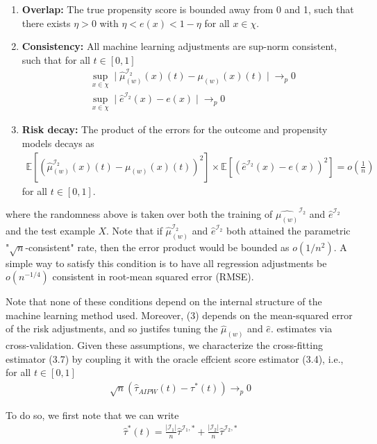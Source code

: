 \begin{enumerate}
    \item \textbf{Overlap:} The true propensity score is bounded away from 0 and 1, such
    that there exists $\eta > 0$ with $\eta < e(x) < 1 - \eta$ for all $x \in \chi$.
    \item \textbf{Consistency:} All machine learning adjustments are sup-norm
    consistent, such that for all $t \in [0, 1]$
    \begin{align}
        &\sup_{x \in \chi} \mid \hat{\mu}_{(w)}^{\mathcal{I}_2}(x)(t) - \mu_{(w)}(x)(t)
        \mid \to_p 0\\
        &\sup_{x \in \chi} \mid \hat{e}^{\mathcal{I}_2}(x) - e(x) \mid \to_p 0
    \end{align}
    \item \textbf{Risk decay:} The product of the errors for the outcome and propensity
    models decays as
    \begin{align}
        \mathbb{E}[(\hat{\mu}_{(w)}^{\mathcal{I}_2}(x)(t) - \mu_{(w)}(x)(t))^2] \times
        \mathbb{E}[(\hat{e}^{\mathcal{I}_2}(x) - e(x))^2] = o(\frac{1}{n})
    \end{align}
    for all $t \in [0, 1]$.
\end{enumerate}
where the randomness above is taken over both the training of
$\hat{\mu_{(w)}}^{\mathcal{I}_2}$ and $\hat{e}^{\mathcal{I}_2}$ and the test example
$X$. Note that if $\hat{\mu}_{(w)}^{\mathcal{I}_2}$ and $\hat{e}^{\mathcal{I}_2}$ both
attained the parametric "$\sqrt{n}$-consistent" rate, then the error product would be
bounded as $o(1/n^2)$. A simple way to satisfy this condition is to have all regression
adjustments be $o(n^{-1/4})$ consistent in root-mean squared error (RMSE).

Note that none of these conditions depend on the internal structure of the machine
learning method used. Moreover, (3) depends on the mean-squared error of the risk
adjustments, and so justifes tuning the $\hat{\mu}_{(w)}$ and $\hat{e}$. estimates via
cross-validation. Given these assumptions, we characterize the cross-fitting estimator
(3.7) by coupling it with the oracle effcient score estimator (3.4), i.e., for all
$t \in [0, 1]$
\begin{align}
    \sqrt{n} (\hat{\tau}_{AIPW}(t) - \tau^\ast(t)) \to_p 0
\end{align}

To do so, we first note that we can write
\begin{align}
    \hat{\tau}^\ast(t) = \frac{|\mathcal{I}_1|}{n} \hat{\tau}^{\mathcal{I}_1, \ast} +
    \frac{|\mathcal{I}_2|}{n} \hat{\tau}^{\mathcal{I}_2, \ast}
\end{align}

